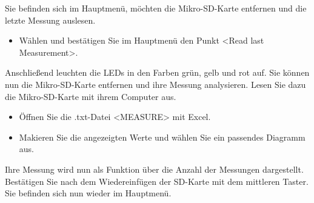 \label{Auswertung}

Sie befinden sich im Hauptmenü, möchten die Mikro-SD-Karte entfernen und die letzte Messung auslesen.
\begin{itemize}
	\item Wählen und bestätigen Sie im Hauptmenü den Punkt <Read last Measurement>. 
\end{itemize}
Anschließend leuchten die \ac{LED}s in den Farben grün, gelb und rot auf. Sie können nun die Mikro-SD-Karte entfernen und ihre Messung analysieren. Lesen Sie dazu die Mikro-SD-Karte mit ihrem Computer aus. 
\begin{itemize}
	\item Öffnen Sie die .txt-Datei <MEASURE> mit Excel.
	\item Makieren Sie die angezeigten Werte und wählen Sie ein passendes Diagramm aus.
\end{itemize}
Ihre Messung wird nun als Funktion über die Anzahl der Messungen dargestellt. Bestätigen Sie nach dem Wiedereinfügen der SD-Karte mit dem mittleren Taster. Sie befinden sich nun wieder im Hauptmenü.
